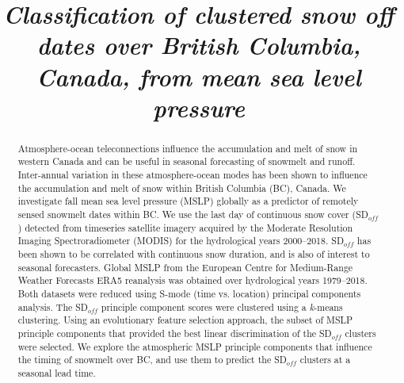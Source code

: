 \documentclass{tATO2e}
\newcommand{\sdoff}{SD$_{off}$}
\begin{document}

\articletype{}%

\title{\textit{Classification of clustered snow off dates over British Columbia, Canada, from mean sea level pressure}}

\author{
}

\maketitle

\begin{abstract}
Atmosphere-ocean teleconnections influence the accumulation and melt of snow in western Canada and can be useful in seasonal forecasting of snowmelt and runoff. Inter-annual variation in these atmosphere-ocean modes has been shown to influence the accumulation and melt of snow within British Columbia (BC), Canada. We investigate fall mean sea level pressure (MSLP) globally as a predictor of remotely sensed snowmelt dates within BC. We use the last day of continuous snow cover (\sdoff{}) detected from timeseries satellite imagery acquired by the Moderate Resolution Imaging Spectroradiometer (MODIS) for the hydrological years 2000--2018. \sdoff{} has been shown to be correlated with continuous snow duration, and is also of interest to seasonal forecasters. Global MSLP from the European Centre for Medium-Range Weather Forecasts ERA5 reanalysis was obtained over hydrological years 1979--2018. Both datasets were reduced using S-mode (time vs. location) principal components analysis. The \sdoff{} principle component scores were clustered using a \textit{k}-means clustering. Using an evolutionary feature selection approach, the subset of MSLP principle components that provided the best linear discrimination of the \sdoff{} clusters were selected. We explore the atmospheric MSLP principle components that influence the timing of snowmelt over BC, and use them to predict the \sdoff{} clusters at a seasonal lead time. 
\end{abstract}
\end{document}

